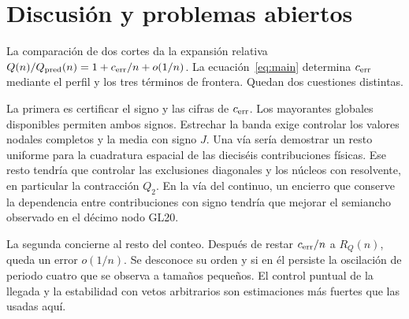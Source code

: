 \section{Discusión y problemas abiertos}\label{sec:discusion}
La comparación de dos cortes da la expansión relativa
\(Q(n)/Q_{\rm pred}(n)=1+c_{\mathrm{err}}/n+o(1/n)\). La ecuación~\eqref{eq:main} determina \(c_{\mathrm{err}}\) mediante
el perfil y los tres términos de frontera. Quedan dos cuestiones distintas.

La primera es certificar el signo y las cifras de \(c_{\mathrm{err}}\). Los mayorantes globales disponibles permiten
 ambos signos. Estrechar la banda exige
controlar los valores nodales completos y la media con signo \(J\). Una vía sería demostrar un
resto uniforme para la cuadratura espacial de las dieciséis contribuciones físicas. Ese resto
tendría que controlar las exclusiones diagonales y los núcleos con resolvente, en particular la
contracción \(Q_2\). En la vía del continuo, un encierro que conserve la dependencia entre
contribuciones con signo tendría que mejorar el semiancho observado en el décimo nodo GL20.

La segunda concierne al resto del conteo. Después de restar \(c_{\mathrm{err}}/n\) a \(R_Q(n)\), queda un error
\(o(1/n)\). Se desconoce su orden y si en él persiste la oscilación de periodo cuatro que se
observa a tamaños pequeños. El control puntual de la llegada
y la estabilidad con vetos arbitrarios son estimaciones más fuertes que las usadas aquí.
